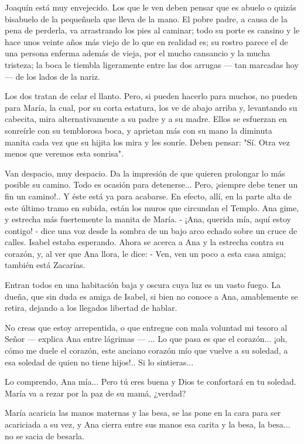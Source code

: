 \documentclass[12pt]{book} %
\begin{document}
Joaquín está muy envejecido. Los que le ven deben pensar que es abuelo o quizás bisabuelo de la pequeñuela que lleva de la mano. El pobre padre, a causa de la pena de perderla, va arrastrando los pies al caminar; todo su porte es cansino y le hace unos veinte años más viejo de lo que en realidad es; su rostro parece el de una persona enferma además de vieja, por el mucho cansancio y la mucha tristeza; la boca le tiembla ligeramente entre las dos arrugas — tan marcadas hoy — de los lados de la nariz. 

Los dos tratan de celar el llanto. Pero, si pueden hacerlo para muchos, no pueden para María, la cual, por su corta estatura, los ve de abajo arriba y, levantando su cabecita, mira alternativamente a su padre y a su madre. Ellos se esfuerzan en sonreírle con su temblorosa boca, y aprietan más con su mano la diminuta manita cada vez que su hijita los mira y les sonríe. Deben pensar: "Sí. Otra vez menos que veremos esta sonrisa". 

Van despacio, muy despacio. Da la impresión de que quieren prolongar lo más posible su camino. Todo es ocasión para detenerse... Pero, ¡siempre debe tener un fin un camino!.. Y éste está ya para acabarse. En efecto, allí, en la parte alta de este último tramo en subida, están los muros que circundan el Templo. Ana gime, y estrecha más fuertemente la manita de María. - ¡Ana, querida mía, aquí estoy contigo! - dice una voz desde la sombra de un bajo arco echado sobre un cruce de calles. Isabel estaba esperando. Ahora se acerca a Ana y la estrecha contra su corazón, y, al ver que Ana llora, le dice: - Ven, ven un poco a esta casa amiga; también está Zacarías. 

Entran todos en una habitación baja y oscura cuya luz es un vasto fuego. La dueña, que sin duda es amiga de Isabel, si bien no conoce a Ana, amablemente se retira, dejando a los llegados libertad de hablar. 

No creas que estoy arrepentida, o que entregue con mala voluntad mi tesoro al Señor — explica Ana entre lágrimas — ... Lo que pasa es que el corazón... ¡oh, cómo me duele el corazón, este anciano corazón mío que vuelve a su soledad, a esa soledad de quien no tiene hijos!.. Si lo sintieras... 

Lo comprendo, Ana mía... Pero tú eres buena y Dios te confortará en tu soledad. María va a rezar por la paz de su mamá, ¿verdad? 

María acaricia las manos maternas y las besa, se las pone en la cara para ser acariciada a su vez, y Ana cierra entre sus manos esa carita y la besa, la besa... no se sacia de besarla. 
\end{document}
